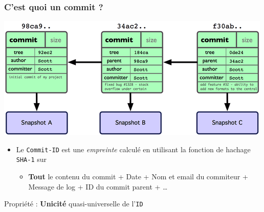 \documentclass[table,tikz,12pt,svgnames]{beamer}
\begin{document}
\begin{frame}
\frametitle{C'est quoi un commit ?}
	\vspace{-1em}
	\begin{block}{}
	\begin{adjustwidth}{-0.5cm}{-0.5cm}{}
		\begin{center}	
			{\includegraphics[scale=0.6]{images/git_commit.png}}
		\end{center}
	\end{adjustwidth}
	\end{block}

	\vspace{-2em}
	\begin{block}{}
	\begin{itemize}
		\item Le \texttt{Commit-ID} est une \textit{empreinte} calculé en utilisant la fonction de hachage \texttt{SHA-1} sur
		\begin{itemize}
			\item \textbf{Tout} le contenu du commit + Date + Nom et email du commiteur + Message de log + ID du commit parent + \ldots
		\end{itemize}
	\end{itemize}
	Propriété : \textbf{Unicité} quasi-universelle de l'\texttt{ID}
\end{block}
\end{frame}
\end{document}
